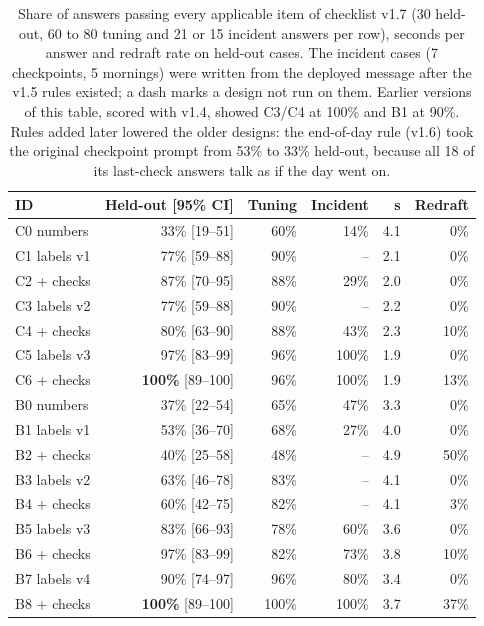 \documentclass[10pt,twocolumn]{article}
\begin{document}
\begin{table}[t]
\centering\small
\setlength{\tabcolsep}{3.2pt}
\begin{tabular}{@{}lrrrrr@{}}
\toprule
ID & Held-out [95\% CI] & Tuning & Incident & s & Redraft\\
\midrule
C0 numbers & 33\% [19--51] & 60\% & 14\% & 4.1 & 0\%\\
C1 labels v1 & 77\% [59--88] & 90\% & -- & 2.1 & 0\%\\
C2 \quad + checks & 87\% [70--95] & 88\% & 29\% & 2.0 & 0\%\\
C3 labels v2 & 77\% [59--88] & 90\% & -- & 2.2 & 0\%\\
C4 \quad + checks & 80\% [63--90] & 88\% & 43\% & 2.3 & 10\%\\
C5 labels v3 & 97\% [83--99] & 96\% & 100\% & 1.9 & 0\%\\
C6 \quad + checks & \textbf{100\%} [89--100] & 96\% & 100\% & 1.9 & 13\%\\
\midrule
B0 numbers & 37\% [22--54] & 65\% & 47\% & 3.3 & 0\%\\
B1 labels v1 & 53\% [36--70] & 68\% & 27\% & 4.0 & 0\%\\
B2 \quad + checks & 40\% [25--58] & 48\% & -- & 4.9 & 50\%\\
B3 labels v2 & 63\% [46--78] & 83\% & -- & 4.1 & 0\%\\
B4 \quad + checks & 60\% [42--75] & 82\% & -- & 4.1 & 3\%\\
B5 labels v3 & 83\% [66--93] & 78\% & 60\% & 3.6 & 0\%\\
B6 \quad + checks & 97\% [83--99] & 82\% & 73\% & 3.8 & 10\%\\
B7 labels v4 & 90\% [74--97] & 96\% & 80\% & 3.4 & 0\%\\
B8 \quad + checks & \textbf{100\%} [89--100] & 100\% & 100\% & 3.7 & 37\%\\
\bottomrule
\end{tabular}
\caption{Share of answers passing every applicable item of checklist v1.7 (30 held-out, 60 to 80 tuning and 21 or 15
incident answers per row), seconds per answer and redraft rate on held-out cases. The incident cases (7 checkpoints,
5 mornings) were written from the deployed message after the v1.5 rules existed; a dash marks a design not run on
them. Earlier versions of this table, scored with v1.4, showed C3/C4 at 100\% and B1 at 90\%. Rules added later lowered
the older designs: the end-of-day rule (v1.6) took the original checkpoint prompt from 53\% to 33\% held-out, because
all 18 of its last-check answers talk as if the day went on.}
\label{tab:messages}
\end{table}
\end{document}
